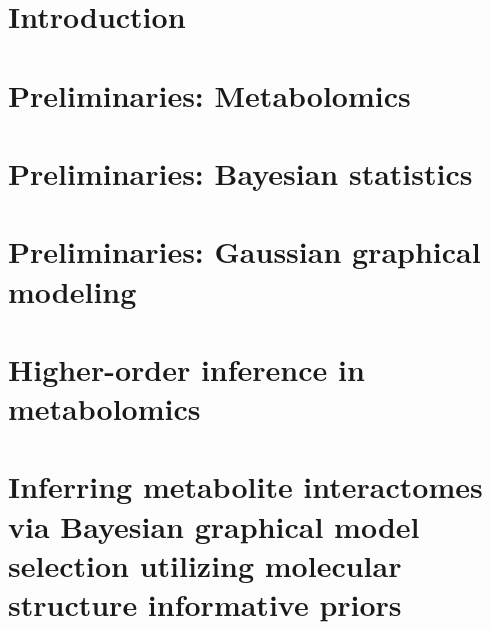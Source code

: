 \documentclass[final]{ulthesis}
\begin{document}
{ \setlength{\beforechapskip}{.75in}  \tableofcontents \clearpage}
{ \setlength{\beforechapskip}{.75in} \listoftables \clearpage}
{ \setlength{\beforechapskip}{.75in} \listoffigures \clearpage}

\mainmatter


\chapter{Introduction}


\chapter{Preliminaries: Metabolomics}


\chapter{Preliminaries: Bayesian statistics}


\chapter{Preliminaries: Gaussian graphical modeling}


\chapter{Higher-order inference in metabolomics}


\chapter{Inferring metabolite interactomes via Bayesian graphical model selection utilizing molecular structure informative priors}

\end{document}
